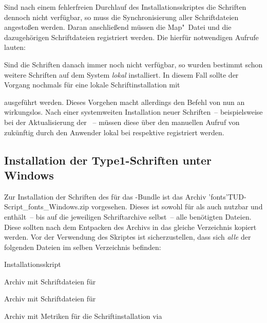 Sind nach einem fehlerfreien Durchlauf des Installationsskriptes die Schriften 
dennoch nicht verfügbar, so muss die Synchronisierung aller Schriftdateien 
angestoßen werden. Daran anschließend müssen die Map"~Datei und die 
dazugehörigen Schriftdateien registriert werden. Die hierfür notwendigen 
Aufrufe lauten:
%
\begin{quoting}
\RET*
{}\RET*
{}\RET
\end{quoting}
%
Sind die Schriften danach immer noch nicht verfügbar, so wurden bestimmt schon 
weitere Schriften auf dem System \emph{lokal} installiert. In diesem Fall 
sollte der Vorgang nochmals für eine lokale Schriftinstallation mit 
%
\begin{quoting}
\RET*
{}\RET*
{}\RET
\end{quoting}
%
ausgeführt werden. Dieses Vorgehen macht allerdings den Befehl 
 von nun an wirkungslos. Nach einer systemweiten Installation 
neuer Schriften~-- beispielsweise bei der Aktualisierung der \Distro~-- 
müssen diese über den manuellen Aufruf von  zukünftig durch den 
Anwender lokal bei \TeXLive respektive \MacTeX registriert werden.




\subsection{%
  Installation der Type1-Schriften unter Windows%
  \label{sec:install:win}%
}

Zur Installation der Schriften des \CDs für das \TUDScript-Bundle ist das 
Archiv \GitHubFile*'fonts'{TUD-Script_fonts_Windows.zip} vorgesehen. Dieses 
ist sowohl für \TeXLive als auch \MiKTeX nutzbar und enthält~-- bis auf die 
jeweiligen Schriftarchive selbst~-- alle benötigten Dateien. Diese sollten nach 
dem Entpacken des Archivs in das gleiche Verzeichnis kopiert werden. Vor der 
Verwendung des Skriptes  ist sicherzustellen, 
dass sich \emph{alle} der folgenden Dateien im selben Verzeichnis befinden:
%
\settowidth{}%
\begin{description}[labelwidth=\tempdim,labelsep=.5em]
  \item[\File*{tudscr_fonts_install.bat}]Installationsskript
  \item[\File*{Univers_PS.zip}]Archiv mit Schriftdateien für \Univers
  \item[\File*{DIN_Bd_PS.zip}]Archiv mit Schriftdateien für \DIN
  \item[\File*{tudscr_fonts_install.zip}]Archiv mit Metriken für die
    Schriftinstallation via 
\end{description}

